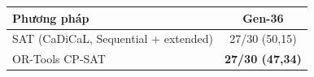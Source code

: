 \begin{tabular}{lc}
\toprule
Phương pháp & Gen-36 \\
\midrule
SAT (CaDiCaL, Sequential + extended) & 27/30 (50,15) \\
OR-Tools CP-SAT & \textbf{27/30 (47,34)} \\
\bottomrule
\end{tabular}
